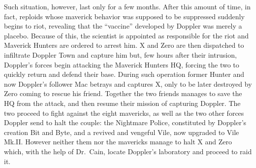 Such situation, however, last only for a few months. After this amount of time, in fact, reploids whose maverick behavior was supposed to be suppressed suddenly begins to riot, revealing that the ``vaccine'' developed by Doppler was merely a placebo. Because of this, the scientist is appointed as responsible for the riot and Maverick Hunters are ordered to arrest him. X and Zero are then dispatched to infiltrate Doppler Town and capture him but, few hours after their intrusion, Doppler's forces begin attacking the Maverick Hunters HQ, forcing the two to quickly return and defend their base. During such operation former Hunter and now Doppler's follower Mac betrays and captures X, only to be later destroyed by Zero coming to rescue his friend. Together the two friends manages to save the HQ from the attack, and then resume their mission of capturing Doppler. The two proceed to fight against the eight mavericks, as well as the two other forces Doppler send to halt the couple: the Nightmare Police, constituted by Doppler's creation Bit and Byte, and a revived and vengeful Vile, now upgraded to Vile Mk.II. However neither them nor the mavericks manage to halt X and Zero which, with the help of Dr.~Cain, locate Doppler's laboratory and proceed to raid it.
